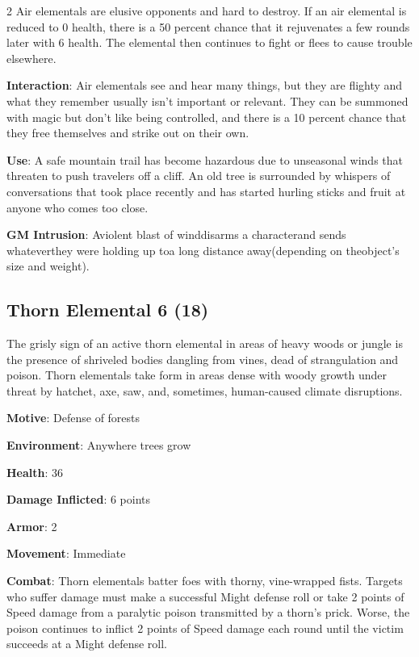 \begin{multicols}{2}
Air elementals are elusive opponents and hard to destroy. If an air elemental is reduced to 0 health, there is a 50 percent chance that it rejuvenates a few rounds later with 6 health. The elemental then continues to fight or flees to cause trouble elsewhere. 

\textbf{Interaction}: Air elementals see and hear many things, but they are flighty and what they remember usually isn’t important or relevant. They can be summoned with magic but don’t like being controlled, and there is a 10 percent chance that they free themselves and strike out on their own. 

\textbf{Use}: A safe mountain trail has become hazardous due to unseasonal winds that threaten to push travelers off a cliff. An old tree is surrounded by whispers of conversations that took place recently and has started hurling sticks and fruit at anyone who comes too close.

\textbf{GM Intrusion}: Aviolent blast of winddisarms a characterand sends whateverthey were holding up toa long distance away(depending on theobject’s size and weight).

\subsection{Thorn Elemental 6 (18)}

The grisly sign of an active thorn elemental in areas of heavy woods or jungle is the presence of shriveled bodies dangling from vines, dead of strangulation and poison. Thorn elementals take form in areas dense with woody growth under threat by hatchet, axe, saw, and, sometimes, human-caused climate disruptions. 

\textbf{Motive}: Defense of forests 

\textbf{Environment}: Anywhere trees grow 

\textbf{Health}: 36 

\textbf{Damage Inflicted}: 6 points 

\textbf{Armor}: 2 

\textbf{Movement}: Immediate 

\textbf{Combat}: Thorn elementals batter foes with thorny, vine-wrapped fists. Targets who suffer damage must make a successful Might defense roll or take 2 points of Speed damage from a paralytic poison transmitted by a thorn’s prick. Worse, the poison continues to inflict 2 points of Speed damage each round until the victim succeeds at a Might defense roll. 


\end{multicols}
